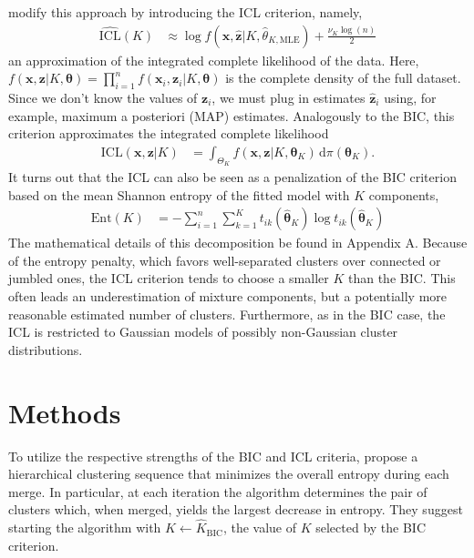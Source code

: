 \documentclass{uwstat572}
\newcommand*\ba{\[ \begin{aligned}}
\newcommand*\ea{\end{aligned} \]}
\newcommand*\estim[1]{\widehat{#1}}
\newcommand*\der{\text{d}}
\newcommand*\bx{\mathbf{x}}
\newcommand*\bz{\mathbf{z}}
\newcommand*\btheta{\boldsymbol{\theta}}
\renewcommand\;{\,}
\begin{document}
\citet{Biernacki00} modify this approach by introducing the ICL criterion, namely,
\ba
\estim{\text{ICL}}(K)
	& \approx 
	\log f(\bx, \estim\bz | K, \estim\theta_{K, \text{MLE}}) + \frac{ \nu_K \log(n) }{2}
\ea
an approximation of the integrated complete likelihood of the data. 
Here, $f(\bx, \bz | K, \btheta) = \prod_{i=1}^n f(\bx_i, \bz_i | K, \btheta)$ is the complete density of the full dataset.
Since we don't know the values of $\bz_i$, we must plug in estimates $\estim\bz_i$ using, for example, maximum a posteriori (MAP) estimates.
Analogously to the BIC, this criterion approximates the integrated complete likelihood
\ba
\text{ICL}(\bx, \bz | K)
	& = \int_{\Theta_K} f(\bx, \bz | K, \btheta_K) \; \der \pi(\btheta_K).
\ea
It turns out that the ICL can also be seen as a penalization of the BIC criterion based on the mean Shannon entropy of the fitted model with $K$ components, 
\ba
\text{Ent}(K)
	& = - \sum_{i=1}^n \sum_{k = 1}^K t_{ik}(\estim\btheta_K) \log t_{ik}(\estim\btheta_K)
\ea
The mathematical details of this decomposition be found in Appendix A.
Because of the entropy penalty, which favors well-separated clusters over connected or jumbled ones, the ICL criterion tends to choose a smaller $K$ than the BIC.
This often leads an underestimation of mixture components, but a potentially more reasonable estimated number of clusters.
Furthermore, as in the BIC case, the ICL is restricted to Gaussian models of possibly non-Gaussian cluster distributions.


\section{Methods}
To utilize the respective strengths of the BIC and ICL criteria, \cite{Baudry10}  propose a hierarchical clustering sequence that minimizes the overall entropy during each merge.
In particular, at each iteration the algorithm determines the pair of clusters which, when merged, yields the largest decrease in entropy.
They suggest starting the algorithm with $K \gets \estim K_\text{BIC}$, the value of $K$ selected by the BIC criterion.
\end{document}
